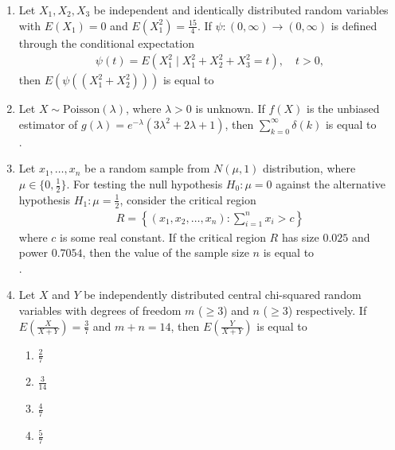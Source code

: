 \documentclass[journal]{IEEEtran}
\numberwithin{equation}{enumi}
\numberwithin{figure}{enumi}
\begin{document}
\begin{enumerate}
 \item Let $X_1, X_2, X_3$ be independent and identically distributed random variables with $E(X_1) = 0$ and $E(X_1^2) = \frac{15}{4}$. If $\psi : (0, \infty) \to (0, \infty)$ is defined through the conditional expectation
\begin{align*}
\psi(t) = E(X_1^2 \mid X_1^2 + X_2^2 + X_3^2 = t), \quad t > 0,
\end{align*}
then $E\left(\psi((X_1^2 + X_2^2))\right)$ is equal to \underline{\hspace{2cm}}
 \hfill{} 
 \vspace{1em}

 \item Let $X \sim \mathrm{Poisson}(\lambda)$, where $\lambda > 0$ is unknown. If $f(X)$ is the unbiased estimator of $g(\lambda) = e^{-\lambda}(3\lambda^2 + 2\lambda + 1)$, then $\sum_{k=0}^\infty \delta(k)$ is equal to  \underline{\hspace{2cm}}\\
 . \hfill{}

\item Let $x_1, \ldots, x_n$ be a random sample from $N(\mu, 1)$ distribution, where $\mu \in \{0, \frac{1}{2}\}$. For testing the null hypothesis $H_0: \mu = 0$ against the alternative hypothesis $H_1: \mu = \frac{1}{2}$, consider the critical region
\begin{align*}
R = \left\{ (x_1, x_2, \ldots, x_n) : \sum_{i=1}^n x_i > c \right\}
\end{align*}
where $c$ is some real constant. If the critical region $R$ has size $0.025$ and power $0.7054$, then the value of the sample size $n$ is equal to \underline{\hspace{2cm}}\\
. \hfill{}


\item Let $X$ and $Y$ be independently distributed central chi-squared random variables with degrees of freedom $m$ ($\geq 3$) and $n$ ($\geq 3$) respectively. If $E\left(\frac{X}{X+Y}\right) = \frac{3}{7}$ and $m + n = 14$, then $E\left(\frac{Y}{X+Y}\right)$ is equal to
\hfill{}
\begin{multicols}{4}
\begin{enumerate}
 \item  $\frac{2}{7}$ 
 \item  $\frac{3}{14}$ 
 \item  $\frac{4}{7}$ 
 \item  $\frac{5}{7}$
\end{enumerate}
\end{multicols}



\end{enumerate}
\end{document}
